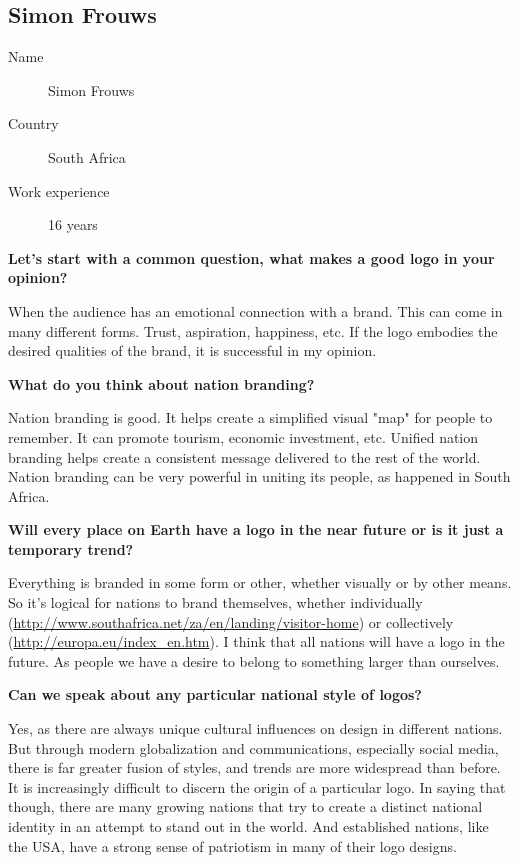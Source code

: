 \subsection{Simon Frouws}

\begin{description}
\item[Name] Simon Frouws
\item[Country] South Africa
\item[Work experience] 16 years
\end{description}

\textbf{Let's start with a common question, what makes a good logo in your
  opinion?}

When the audience has an emotional connection with a brand. This can come in
many different forms. Trust, aspiration, happiness, etc. If the logo embodies
the desired qualities of the brand, it is successful in my opinion.


\textbf{What do you think about nation branding?}

Nation branding is good. It helps create a simplified visual "map" for people to
remember. It can promote tourism, economic investment, etc. Unified nation
branding helps create a consistent message delivered to the rest of the
world. Nation branding can be very powerful in uniting its people, as happened
in South Africa.


\textbf{Will every place on Earth have a logo in the near future or is it just a
  temporary trend?}

Everything is branded in some form or other, whether visually or by other
means. So it's logical for nations to brand themselves, whether individually
(\url{http://www.southafrica.net/za/en/landing/visitor-home}) or collectively
(\url{http://europa.eu/index_en.htm}). I think that all nations will have a logo in
the future. As people we have a desire to belong to something larger than
ourselves.


\textbf{Can we speak about any particular national style of logos?}

Yes, as there are always unique cultural influences on design in different
nations. But through modern globalization and communications, especially social
media, there is far greater fusion of styles, and trends are more widespread
than before. It is increasingly difficult to discern the origin of a particular
logo. In saying that though, there are many growing nations that try to create a
distinct national identity in an attempt to stand out in the world. And
established nations, like the USA, have a strong sense of patriotism in many of
their logo designs.


